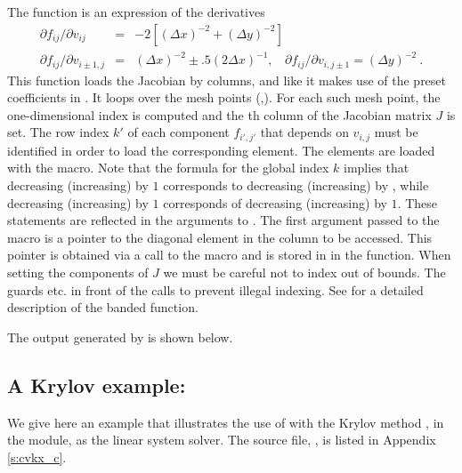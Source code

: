 The  function is an expression of the derivatives
\vspace*{-.08in}
\begin{eqnarray*}
\partial f_{ij} / \partial v_{ij} &=&
         -2 [(\Delta x)^{-2} + (\Delta y)^{-2}] \\
\partial f_{ij} / \partial v_{i \pm 1,j} &=& (\Delta x)^{-2} 
                  \pm .5 (2 \Delta x)^{-1}, ~~~~
\partial f_{ij} / \partial v_{i,j \pm 1}  =  (\Delta y)^{-2} ~. 
\end{eqnarray*}
This function loads the Jacobian by columns, and like  it
makes use of the preset coefficients in .
It loops over the mesh points (,). For each such mesh
point, the one-dimensional index  is computed
and the th column of the Jacobian matrix $J$ is set. 
The row index $k'$ of each component $f_{i',j'}$ that depends on
$v_{i,j}$ must be identified in order to load the corresponding element.
The elements are loaded with the  macro.
Note that the formula for the global index $k$ implies that decreasing 
(increasing)  by $1$ corresponds to decreasing (increasing) 
 by , while decreasing (increasing)  by $1$ 
corresponds of decreasing (increasing)  by $1$. 
These statements are reflected in the arguments to . 
The first argument passed to the  macro is a pointer to
the diagonal element in the column to be accessed. This pointer is obtained
via a call to the  macro and is stored in  in
the  function. When setting the components of $J$ we must be
careful not to index out of bounds. The guards  etc.
in front of the calls to  prevent illegal indexing.
See  for a detailed description of the banded 
function.

The output generated by  is shown below.



\subsection{A Krylov example: }\label{ss:cvkx}

We give here an example that illustrates the use of {\cvode} with the Krylov
method {\spgmr}, in the {\cvspgmr} module, as the linear system solver.  
The source file, , is listed in Appendix \ref{s:cvkx_c}.

